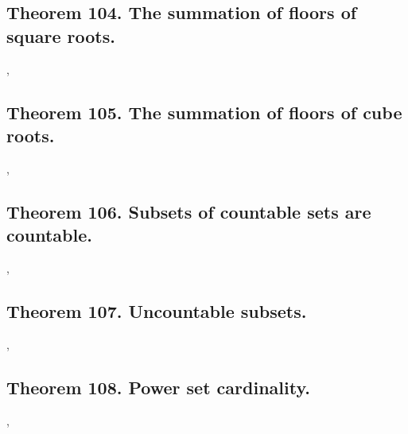 \documentclass[preview]{standalone}
\begin{document}
\subsection[The summation of floors of square roots.]{
    \color{section} Theorem 104. \color{black} The summation of floors of square roots.
}

\sep
\pagebreak

\subsection[The summation of floors of cube roots.]{
    \color{section} Theorem 105. \color{black} The summation of floors of cube roots.
}

\sep
\pagebreak


\subsection[Subsets of countable sets are countable.]{
    \color{section} Theorem 106. \color{black} Subsets of countable sets are countable.
}

\sep


\subsection[Uncountable subsets imply an uncountable superset.]{
    \color{section} Theorem 107. \color{black} Uncountable subsets.
}

\sep


\subsection[Power set cardinality.]{
    \color{section} Theorem 108. \color{black} Power set cardinality.
}

\sep
\pagebreak


\end{document}
